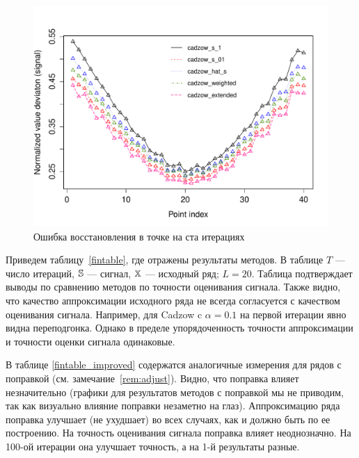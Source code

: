 \documentclass[12pt,a4paper,fleqn,leqno]{article}
\begin{document}
\begin{figure}[!hhh]
\begin{center}
\includegraphics[width = 13cm]{s1_it100.pdf}
\caption{Ошибка восстановления в точке на ста итерациях}
\label{fig:s1_it100}
\end{center}
\end{figure}


Приведем таблицу~\ref{fintable}, где отражены результаты методов.
В таблице $T$ --- число итераций, $\mathbb{S}$ --- сигнал, $\mathbb{X}$ --- исходный ряд; $L=20$. Таблица подтверждает выводы по сравнению методов по точности
оценивания сигнала. Также видно, что качество аппроксимации исходного ряда не всегда согласуется с качеством оценивания сигнала.
Например, для Cadzow c $\alpha=0.1$ на первой итерации явно видна переподгонка. Однако в пределе упорядоченность точности аппроксимации
и точности оценки сигнала одинаковые.

В таблице \ref{fintable_improved} содержатся аналогичные измерения для рядов с поправкой (см. замечание~\ref{rem:adjust}).
Видно, что поправка влияет незначительно (графики для результатов методов с поправкой мы не приводим, так как визуально влияние поправки незаметно на глаз). Аппроксимацию ряда поправка улучшает (не ухудшает) во всех случаях,
как и должно быть по ее построению. На точность оценивания сигнала поправка влияет неоднозначно. На 100-ой итерации она улучшает точность,
а на 1-й результаты разные. 
\end{document}
